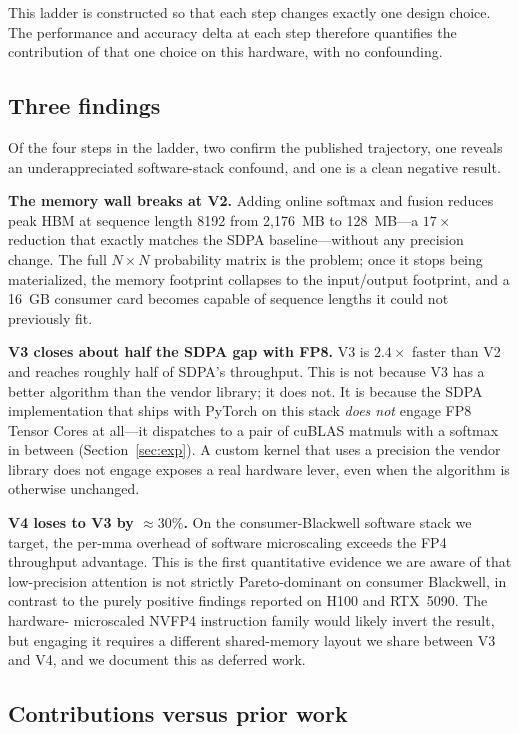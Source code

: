 \documentclass[conference]{IEEEtran}
\begin{document}
This ladder is constructed so that each step changes exactly one design
choice. The performance and accuracy delta at each step therefore
quantifies the contribution of that one choice on this hardware, with
no confounding.

\subsection*{Three findings}

Of the four steps in the ladder, two confirm the published trajectory,
one reveals an underappreciated software-stack confound, and one is a
clean negative result.

\textbf{The memory wall breaks at V2.} Adding online softmax and fusion
reduces peak HBM at sequence length 8192 from 2,176~MB to 128~MB---a
$17\times$ reduction that exactly matches the SDPA baseline---without
any precision change. The full $N\times N$ probability matrix is the
problem; once it stops being materialized, the memory footprint
collapses to the input/output footprint, and a 16~GB consumer card
becomes capable of sequence lengths it could not previously fit.

\textbf{V3 closes about half the SDPA gap with FP8.} V3 is $2.4\times$
faster than V2 and reaches roughly half of SDPA's throughput. This is
not because V3 has a better algorithm than the vendor library; it does
not. It is because the SDPA implementation that ships with PyTorch on
this stack \emph{does not} engage FP8 Tensor Cores at all---it
dispatches to a pair of cuBLAS matmuls with a softmax in between
(Section~\ref{sec:exp}). A custom kernel that uses a precision the
vendor library does not engage exposes a real hardware lever, even
when the algorithm is otherwise unchanged.

\textbf{V4 loses to V3 by $\approx 30\%$.} On the consumer-Blackwell
software stack we target, the per-mma overhead of software microscaling
exceeds the FP4 throughput advantage. This is the first quantitative
evidence we are aware of that low-precision attention is not strictly
Pareto-dominant on consumer Blackwell, in contrast to the purely
positive findings reported on H100 and RTX~5090. The hardware-
microscaled NVFP4 instruction family would likely invert the result,
but engaging it requires a different shared-memory layout we share
between V3 and V4, and we document this as deferred work.

\subsection*{Contributions versus prior work}
\end{document}

